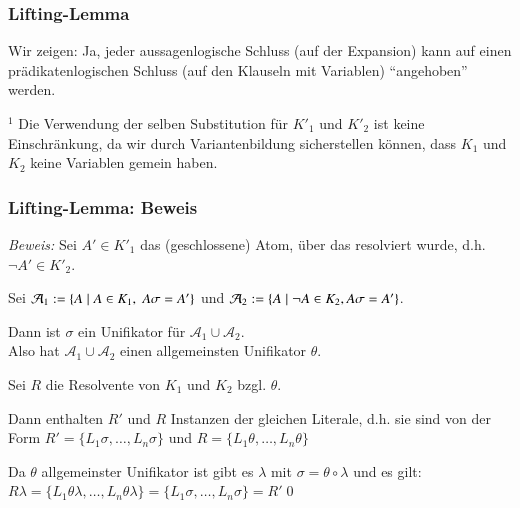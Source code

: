 \documentclass[aspectratio=1610,onlymath]{beamer}
\begin{document}
\begin{frame}\frametitle{Lifting-Lemma}

Wir zeigen: Ja, jeder aussagenlogische Schluss (auf der Expansion) kann auf einen prädikatenlogischen Schluss (auf den Klauseln mit Variablen) "`angehoben"' werden.\medskip


\color{devilscss}
{\footnotesize ${^1}$ Die Verwendung der selben Substitution für $K'_1$ und $K'_2$ ist keine Einschränkung, da wir durch Variantenbildung sicherstellen können, dass $K_1$ und $K_2$ keine Variablen gemein haben.

}

\end{frame}

\begin{frame}\frametitle{Lifting-Lemma: Beweis}


\emph{Beweis:} Sei $A'\in K'_1$ das (geschlossene) Atom, über das resolviert wurde, d.h. $\neg A'\in K'_2$.\smallskip\pause

Sei $\mathcal{A}_1\mathrel{:=}\{A\mid A\in K_1,\;A\sigma=A'\}$ und $\mathcal{A}_2\mathrel{:=}\{A\mid \neg A\in K_2, A\sigma=A'\}$.\smallskip\pause

Dann ist $\sigma$ ein Unifikator für $\mathcal{A}_1\cup\mathcal{A}_2$.\\ Also hat $\mathcal{A}_1\cup\mathcal{A}_2$ einen allgemeinsten Unifikator $\theta$.\smallskip\pause

Sei $R$ die Resolvente von $K_1$ und $K_2$ bzgl. $\theta$.\smallskip\pause

Dann enthalten $R'$ und $R$ Instanzen der gleichen Literale, d.h. sie sind von der Form
$R'=\{L_1\sigma,\ldots,L_n\sigma\}$ und $R=\{L_1\theta,\ldots,L_n\theta\}$\smallskip\pause

Da $\theta$ allgemeinster Unifikator ist gibt es $\lambda$ mit $\sigma=\theta\circ\lambda$
und es gilt: $R\lambda=\{L_1\theta\lambda,\ldots,L_n\theta\lambda\}=\{L_1\sigma,\ldots,L_n\sigma\}=R'$\qed


\end{frame}
\end{document}

